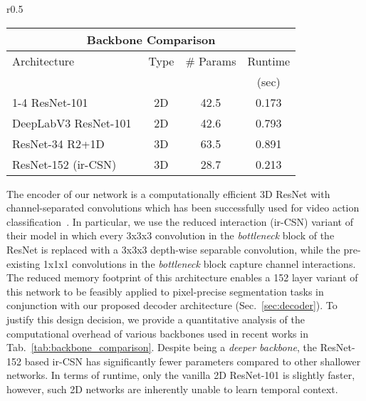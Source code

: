 \documentclass{bmvc2k_arxiv}
\begin{document}
\begin{wraptable}{r}{0.5\textwidth}
\centering
\scriptsize
{}
\setlength{\tabcolsep}{5px}\vspace{-10pt}
\begin{tabular}{|l|c|c|c|}
\toprule
 \multicolumn{4}{c}{Backbone Comparison} \\
 \midrule
 Architecture & Type & \# Params            & Runtime \\
              &      &  & (sec)     \\
\cmidrule(lr){1-4}
ResNet-101~\cite{He16CVPR}                     & 2D & 42.5 & 0.173 \\
DeepLabV3 ResNet-101~\cite{Chen17ARXIV}        & 2D & 42.6 & 0.793 \\
ResNet-34 R2+1D ~\cite{Tran18CVPR} & 3D & 63.5 & 0.891 \\
ResNet-152 (ir-CSN)~\cite{Tran19ICCV}    & 3D & 28.7 & 0.213 \\
\bottomrule
\end{tabular}
\caption{Comparison of various backbones. Runtime is for generating feature maps for an 8-frame clip with  resolution on an Nvidia GTX-1080Ti. : lower stride~\cite{Hou19BMVC}} 
\vspace{-2mm}
\label{tab:backbone_comparison}
\end{wraptable} 
The encoder of our network is a computationally efficient 3D ResNet with channel-separated convolutions which has been successfully used for video action classification~\cite{Tran19ICCV}. In particular, we use the reduced interaction (ir-CSN) variant of their model in which every 3x3x3 convolution in the \textit{bottleneck} block of the ResNet is replaced with a 3x3x3 depth-wise separable convolution, while the pre-existing 1x1x1 convolutions in the \textit{bottleneck} block capture channel interactions. The reduced memory footprint of this architecture enables a 152 layer variant of this network to be feasibly applied to pixel-precise segmentation tasks in conjunction with our proposed decoder architecture (Sec.~\ref{sec:decoder}). 
To justify this design decision, we provide a quantitative analysis of the computational overhead of various backbones used in recent works in Tab.~\ref{tab:backbone_comparison}. 
Despite being a \textit{deeper backbone}, the ResNet-152 based ir-CSN has significantly fewer parameters compared to other shallower networks. In terms of runtime, only the vanilla 2D ResNet-101 is slightly faster, however, such 2D networks are inherently unable to learn temporal context. 
\end{document}
